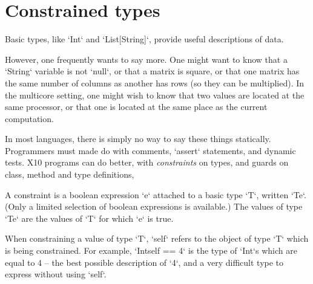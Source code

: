 

\section{Constrained types}
\label{ConstrainedTypes}
\label{DepType:DepType}
\label{DepTypes}



Basic types, like \xcd`Int` and \xcd`List[String]`, provide useful
descriptions of data.  

However, one frequently wants to say more.  One might want to know
that a \xcd`String` variable is not \xcd`null`, or that a matrix is
square, or that one matrix has the same number of columns as another
has rows (so they can be multiplied).  In the multicore setting, one
might wish to know that two values are located at the same processor,
or that one is located at the same place as the current computation.

In most languages, there is simply no way to say these things
statically.  Programmers must made do with comments, \xcd`assert`
statements, and dynamic tests.  X10 programs can do better, with {\em
  constraints} on types, and guards on class, method and type
definitions,

A constraint is a boolean expression \xcd`e` attached to a basic type \xcd`T`,
written \xcd`T{e}`.  (Only a limited selection of boolean expressions is
available.)  The values of type \xcd`T{e}` are the values of \xcd`T` for which
\xcd`e` is true.  

When constraining a value of type \xcd`T`, \xcd`self` refers to the object of
type \xcd`T` which is being constrained.  For example, \xcd`Int{self == 4}` is
the type of \xcd`Int`s which are equal to 4 -- the best possible description
of \xcd`4`, and a very difficult type to express without using \xcd`self`.  

